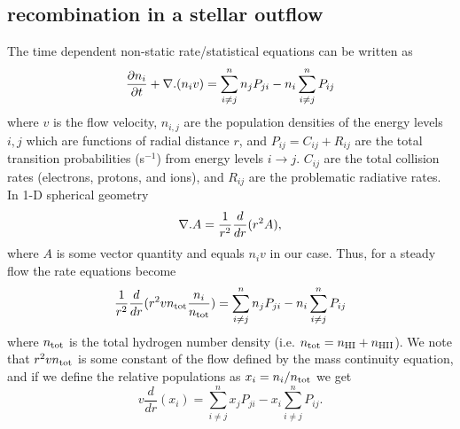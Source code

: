 \subsection{ recombination in a stellar outflow}\label{sec:6.6.1}

The time dependent non-static rate/statistical equations can be written as
\begin{equation}
\frac{\partial n_{i}}{\partial t}+{\bf \nabla }{.(n_{i}v)} = \sum_{i\neq j}^n n_{j}P_{ji} - n_{i}\sum_{i\neq j}^n P_{ij} 
\end{equation}
where $v$ is the flow velocity, $n_{i,j}$ are the population densities of the energy levels $i,j$ which are functions of radial distance $r$, and  $P_{ij}=C_{ij}+R_{ij}$ are the total transition probabilities (s$^{-1}$) from energy levels $i \rightarrow j$. $C_{ij}$ are the total collision rates (electrons, protons, and ions), and $R_{ij}$ are the problematic radiative rates. In 1-D spherical geometry
\begin{equation}
{\bf \nabla }{.A} = \frac{1}{r^2}\frac{d}{dr}(r^2 A),
\end{equation}
where $A$ is some vector quantity and equals $n_{i}v$ in our case. Thus, for a steady flow the rate equations become
\begin{equation}
\frac{1}{r^2}\frac{d}{dr}(r^2 vn_{\rm{tot}}\frac{n_{i}}{n_{\rm{tot}}}) = \sum_{i\neq j}^{n} n_{j}P_{ji} - n_{i}\sum_{i\neq j}^n P_{ij}
\end{equation}
where $n_{\rm{tot}}$ is the total hydrogen number density (i.e. $n_{\rm{tot}} = n_{\rm{HI}}+n_{\rm{HII}}$).
We note that $r^2 vn_{\rm{tot}}$ is some constant of the flow defined by the mass continuity equation, and if we define the relative populations as $x_{i}=n_{i}/n_{\rm{tot}}$ we get
\begin{equation}
v\frac{d}{dr}(x_{i}) = \sum_{i\neq j}^{n} x_{j}P_{ji} - x_{i}\sum_{i\neq j}^n P_{ij}.
\label{eq:eq6.9.1}
\end{equation}

